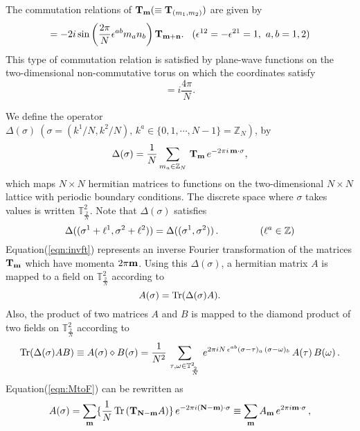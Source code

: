 \documentclass[12pt,a4paper]{article}
\newcommand{\ncpl}{{\mathbb T}^2_\frac{2}{N}}
\newcommand{\Integer}{\mathbb Z}
\newcommand{\Tr}{\mbox{\rm Tr}}
\begin{document}
The commutation relations of ${\bf T}_{\bf m}
(\equiv {\bf T}_{(m_1,m_2)})$ are given by \cite{moyal,weyl}
\begin{equation}
	[ {\bf T}_{\bf m},{\bf T}_{\bf n} ]
	=-2i\sin\left({\frac{2\pi}{N}}\epsilon^{ab}m_an_b\right)
	{\bf T}_{\bf m+n}. \hspace{3mm}
	(\epsilon^{12}=-\epsilon^{21}=1,~a,b=1,2) \label{eqn:sinalg}
\end{equation}
This type of commutation relation is satisfied by plane-wave
functions on the two-dimensional non-commutative torus on which the
coordinates satisfy \cite{CDS}
\begin{equation}
	[x_1,x_2]=i{\frac{4\pi}{N}}. \label{eqn:2Dcr}
\end{equation}

We define the operator
$\Delta(\sigma)~(\sigma=(k^1/N,k^2/N),\, k^a\in \{0,1,\cdots,N-1\} =
\Integer_N)$, by
\begin{equation}
    \Delta(\sigma)={\frac{1}{N}}\sum_{m_a\in\Integer_N}\,
    {\bf T}_{\bf m}\,e^{-2\pi i\,{\bf m\cdot\sigma}},\label{eqn:invft}
\end{equation}
which maps $N\times N$ hermitian matrices to functions on the
two-dimensional $N\times N$ lattice with periodic boundary
conditions. The discrete space where $\sigma$ takes values is written
$\ncpl$.
Note that $\Delta(\sigma)$ satisfies
\begin{equation}
	\Delta((\sigma^1 +
	\ell^1,\sigma^2+\ell^2))=\Delta((\sigma^1,\sigma^2))\,.
	\hspace{10ex} (\ell^a\in\Integer)
\end{equation}
Equation(\ref{eqn:invft}) represents an inverse Fourier transformation
of the matrices ${\bf T}_{\bf m}$ which have momenta $2\pi{\bf m}$.
Using this $\Delta(\sigma)$, a hermitian matrix $A$ is mapped to a
field on $\ncpl$ according to
\begin{equation}
	A(\sigma)=\Tr(\Delta(\sigma)A). \label{eqn:MtoF}
\end{equation}
Also, the product of two matrices $A$ and $B$ is mapped to the diamond
product \cite{bars} of two fields on $\ncpl$ according to
\begin{equation}
    \Tr(\Delta(\sigma)AB) \equiv A(\sigma)\diamond B(\sigma)
	= \frac{1}{N^2}\,\sum_{\tau,\omega\in\ncpl}\,
	e^{2\pi i N\,\epsilon^{ab} (\sigma - \tau)_a\,
	(\sigma - \omega)_b}\, A(\tau)\,B(\omega)\,.
	\label{eqn:TwoMTRX}
\end{equation}
Equation(\ref{eqn:MtoF}) can be rewritten as
\begin{equation}
    A(\sigma)= \sum_{\bf m}\{\frac{1}{N}\,\Tr\,({\bf T_{N-m}}A)\}\,
	e^{-2\pi i ({\bf N-m})\cdot \sigma} \equiv
      \sum_{\bf m} A_{\bf m}\,e^{2\pi i {\bf m}\cdot \sigma}\,,
\end{equation}
\end{document}
